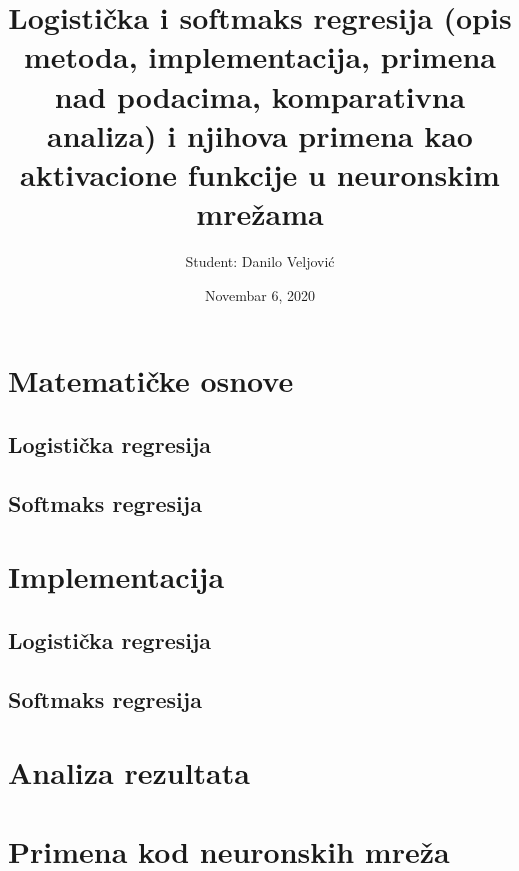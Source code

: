 \documentclass[a4paper,12pt]{report}
\begin{document}
\renewcommand{\contentsname}{Sadržaj}
\renewcommand{\chaptername}{Poglavlje}

\title{\Large{\textbf{Logistička i softmaks regresija (opis metoda, implementacija, primena nad podacima, komparativna analiza) i njihova primena kao aktivacione funkcije u neuronskim mrežama }}}
\author{Student: Danilo Veljović}
\date{Novembar 6, 2020}
\maketitle
\let\cleardoublepage\clearpage
\tableofcontents


\setcounter{page}{1}

\chapter{Matematičke osnove}

\section{Logistička regresija}

\section{Softmaks regresija}

\chapter{Implementacija}

\section{Logistička regresija}

\section{Softmaks regresija}

\chapter{Analiza rezultata}

\chapter{Primena kod neuronskih mreža}
\end{document}
